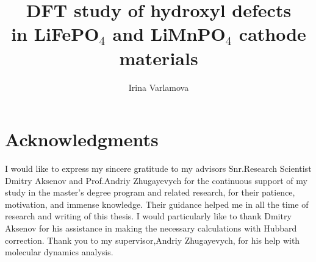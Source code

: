 
\title{DFT study of hydroxyl defects \\ in LiFePO$_4$ and LiMnPO$_4$ cathode materials}

\author{Irina Varlamova}







\maketitle
\rusmaketitle

\setcounter{savepage}{\thepage}
\begin{abstractpage}

\end{abstractpage}

 \setcounter{page}{\thesavepage}
 \begin{abstractpagerus}
 
 \end{abstractpagerus}


\section*{\centering Acknowledgments}

I would like to express my sincere gratitude to my advisors Snr.Research Scientist Dmitry Aksenov and Prof.Andriy Zhugayevych for the continuous support of my study in the master's degree program and related research, for their patience, motivation, and immense knowledge. Their guidance helped me in all the time of research and writing of this thesis. I would particularly like to thank Dmitry Aksenov for his assistance in making the necessary calculations with Hubbard correction. Thank you to my supervisor,Andriy Zhugayevych, for his help with molecular dynamics analysis.



